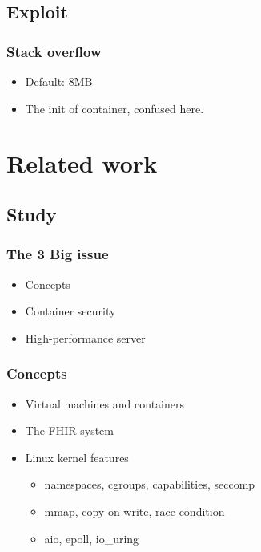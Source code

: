 \documentclass{beamer}
\begin{document}
\subsection{Exploit}
\begin{frame}
    \frametitle{Stack overflow}
    \begin{itemize}
        \item Default: 8MB
        \item The init of container, confused here.
    \end{itemize}
    \cite{thread}
\end{frame}


\section{Related work}
\subsection{Study}
\begin{frame}
    \frametitle{The 3 Big issue}
    \begin{itemize}
        \item Concepts
        \item Container security
        \item High-performance server
    \end{itemize}
\end{frame}

\begin{frame}
    \frametitle{Concepts}
    \begin{itemize}
        \item Virtual machines and containers
        \item The FHIR system
        \item Linux kernel features
              \begin{itemize}
                  \item namespaces, cgroups, capabilities, seccomp
                  \item mmap, copy on write, race condition
                  \item aio, epoll, io\_uring
              \end{itemize}
    \end{itemize}
\end{frame}
\end{document}
